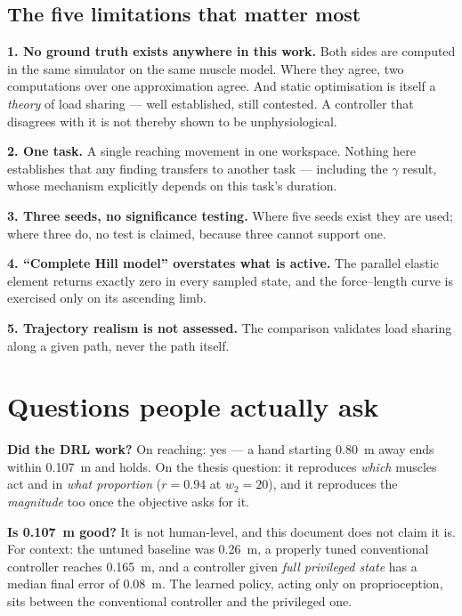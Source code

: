 \subsection{The five limitations that matter most}

\textbf{1. No ground truth exists anywhere in this work.} Both sides are computed
in the same simulator on the same muscle model. Where they agree, two
computations over one approximation agree. And static optimisation is itself a
\emph{theory} of load sharing --- well established, still contested. A controller
that disagrees with it is not thereby shown to be unphysiological.

\textbf{2. One task.} A single reaching movement in one workspace. Nothing here
establishes that any finding transfers to another task --- including the $\gamma$
result, whose mechanism explicitly depends on this task's duration.

\textbf{3. Three seeds, no significance testing.} Where five seeds exist they are
used; where three do, no test is claimed, because three cannot support one.

\textbf{4. ``Complete Hill model'' overstates what is active.} The parallel
elastic element returns exactly zero in every sampled state, and the
force--length curve is exercised only on its ascending limb.

\textbf{5. Trajectory realism is not assessed.} The comparison validates load
sharing along a given path, never the path itself.

\section{Questions people actually ask}

\textbf{Did the DRL work?} On reaching: yes --- a hand starting \SI{0.80}{\meter}
away ends within \SI{0.107}{\meter} and holds. On the thesis question: it
reproduces \emph{which} muscles act and in \emph{what proportion} ($r = 0.94$ at
$w_2 = 20$), and it reproduces the \emph{magnitude} too once the objective asks
for it.

\textbf{Is \SI{0.107}{\meter} good?} It is not human-level, and this document does
not claim it is. For context: the untuned baseline was \SI{0.26}{\meter}, a
properly tuned conventional controller reaches \SI{0.165}{\meter}, and a
controller given \emph{full privileged state} has a median final error of
\SI{0.08}{\meter}. The learned policy, acting only on proprioception, sits between
the conventional controller and the privileged one.

